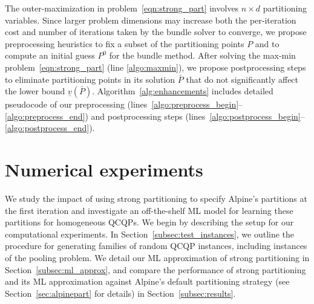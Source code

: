 \documentclass{article}
\newcommand{\pp}{partitioning points}
\begin{document}
The outer-maximization in problem~\eqref{eqn:strong_part} involves $n \times d$ partitioning variables.
Since larger problem dimensions may increase both the per-iteration cost and number of iterations taken by the bundle solver to converge, we propose preprocessing heuristics to fix a subset of the {\pp} $P$ and to compute an initial guess $P^0$ for the bundle method.
After solving the max-min problem~\eqref{eqn:strong_part} (line \ref{algo:maxmin}), we propose postprocessing steps to eliminate {\pp} in its solution $\bar{P}$ that do not significantly affect the lower bound $\underline{v}(\bar{P})$.
Algorithm~\ref{alg:enhancements} includes detailed pseudocode of our preprocessing (lines~\ref{algo:preprocess_begin}--\ref{algo:preprocess_end}) and postprocessing steps (lines~\ref{algo:postprocess_begin}--\ref{algo:postprocess_end}).









\section{Numerical experiments}
\label{sec:computexp}


We study the impact of using strong partitioning to specify Alpine's partitions at the first iteration and investigate an off-the-shelf ML model for learning these partitions for homogeneous QCQPs.
We begin by describing the setup for our computational experiments.
In Section~\ref{subsec:test_instances}, we outline the procedure for generating families of random QCQP instances, including instances of the pooling problem.
We detail our ML approximation of strong partitioning in Section~\ref{subsec:ml_approx}, and compare the performance of strong partitioning and its ML approximation against Alpine's default partitioning strategy (see Section~\ref{sec:alpinepart} for details) in Section~\ref{subsec:results}.
\end{document}
